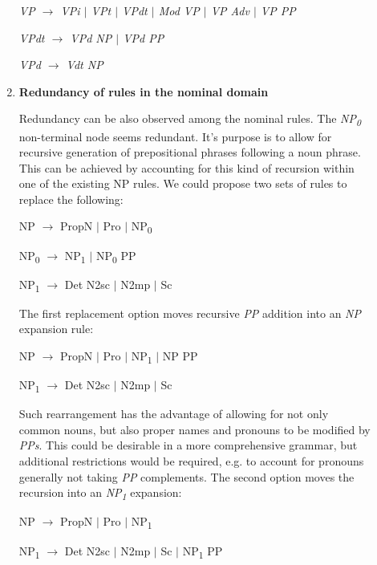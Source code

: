 \documentclass{article}
\begin{document}
\begin{description}
\begin{enumerate}
\begin{center}
			\emph{VP $\rightarrow$ VPi $\vert$ VPt $\vert$ VPdt $\vert$ Mod VP $\vert$ VP Adv $\vert$ VP PP}
			
			\emph{VPdt $\rightarrow$ VPd NP $\vert$ VPd PP}
			
			\emph{VPd $\rightarrow$ Vdt NP}
			
		\end{center}
		
		
		\item
		\textbf{Redundancy of rules in the nominal domain}
		
		Redundancy can be also observed among the nominal rules. The \emph{NP\textsubscript{0}} non-terminal node seems redundant. It's purpose is to allow for recursive generation of prepositional phrases following a noun phrase. This can be achieved by accounting for this kind of recursion within one of the existing NP rules. We could propose two sets of rules to replace the following:
		\begin{center}
			NP $\rightarrow$ PropN $\vert$  Pro $\vert$  NP\textsubscript{0}
			
			NP\textsubscript{0} $\rightarrow$ NP\textsubscript{1} $\vert$  NP\textsubscript{0} PP
			
			NP\textsubscript{1} $\rightarrow$ Det N2sc $\vert$  N2mp $\vert$  Sc
			
		\end{center}
		The first replacement option moves recursive \emph{PP} addition into an \emph{NP} expansion rule:
		\begin{center}
			
			NP $\rightarrow$ PropN $\vert$ Pro $\vert$ NP\textsubscript{1} $\vert$ NP PP
			
			NP\textsubscript{1} $\rightarrow$ Det N2sc $\vert$  N2mp $\vert$  Sc
			
		\end{center}
		Such rearrangement has the advantage of allowing for not only common nouns, but also proper names and pronouns to be modified by \emph{PPs}. This could be desirable in a more comprehensive grammar, but additional restrictions would be required, e.g. to account for pronouns generally not taking \emph{PP} complements.
		The second option moves the recursion into an \emph{NP\textsubscript{1}} expansion:
		\begin{center}
			
			NP $\rightarrow$ PropN $\vert$  Pro $\vert$  NP\textsubscript{1}
			
			NP\textsubscript{1} $\rightarrow$ Det N2sc $\vert$ N2mp $\vert$ Sc $\vert$ NP\textsubscript{1} PP
			

\end{center}
\end{enumerate}
\end{description}
\end{document}
